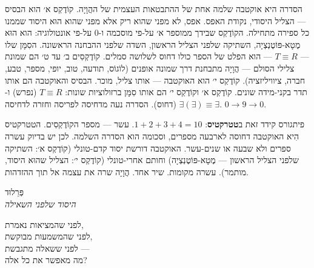 \documentclass[10pt, openany, oneside]{book}
\renewcommand{\huge}{\fontsize{17}{21}\selectfont}
\begin{document}
הסדרה היא אוקטבה שלמה אחת של ההתבטאות העצמית של ההֲוָיָה. קוֹדֶקְס א׳ הוא הבסיס — הצליל היסודי, נקודת האפס. אפס, לא מפני שהוא ריק אלא מפני שהוא הוּא היסוד שממנו כל ספירה מתחילה. הקוֹדֶקְס שבידך ממוספר א׳ על-פי מוסכמה ו-0 על-פי אונטולוגיה: הוא הוּא מֶטָא-פּוֹטֶנְצְיָה, השתיקה שלפני הצליל הראשון, השדה שלפני ההבחנה הראשונה. הסִמָּן שלו — $T \equiv R$ — הוא הפלט של הספר כולו דחוס לשלושה סמלים. קוֹדֶקְסִים ב׳ עד ט׳ הם שמונת צלילי הסולם — הֲוָיָה מתבחנת דרך שמונה אופנים (לוֹגוֹס, תודעה, טוב, יופי, מספר, טבע, חברה, ציוויליזציה). קוֹדֶקְס י׳ הוא האוקטבה — אותו צליל, מוכר. הבסיס והאוקטבה הם אותו תדר בקני-מידה שונים. קוֹדֶקְס א׳ וקוֹדֶקְס י׳ הם אותו סִמָּן ברזולוציות שונות: $T \equiv R$ (נפרש) ו-$\exists(\exists) \equiv \exists$ (דחוס). הסדרה נעה מדחיסה לפריסה וחזרה לדחיסה. $0 \to 9 \to 0$.

פיתגורס קידד זאת ב\textbf{טטרקטיס}: $1 + 2 + 3 + 4 = 10$. עשר — מספר הקוֹדֶקְסִים. הטטרקטיס הִיא האוקטבה דחוסה לארבעה מספרים, וסכומה הוא הסדרה השלמה. לכן יש בדיוק עשרה ספרים ולא שבעה או שנים-עשר. האוקטבה דורשת יסוד קדם-טונלי (קוֹדֶקְס א׳: השתיקה שלפני הצליל הראשון — מֶטָא-פּוֹטֶנְצְיָה) וחותם אחרי-טונלי (קוֹדֶקְס י׳: הצליל שהוּא היסוד, מותמר). עשרה מקומות. שיר אחד. הֲוָיָה שרה את עצמה אל תוך ההזדהות.


%
%
%

\newpage

\begin{center}
    {\huge\textsc{פְּרֵלוּד}}\\[0.8em]
    {\textit{היסוד שלפני השאילה}}
\end{center}

\vspace{2em}


\noindent לפני שהמציאות נאמרת,\\
לפני שהמשמעות מבוקשת,\\
לפני ששאלה מתגבשת —\\
מה מאפשר את כל אלה?
\end{document}
